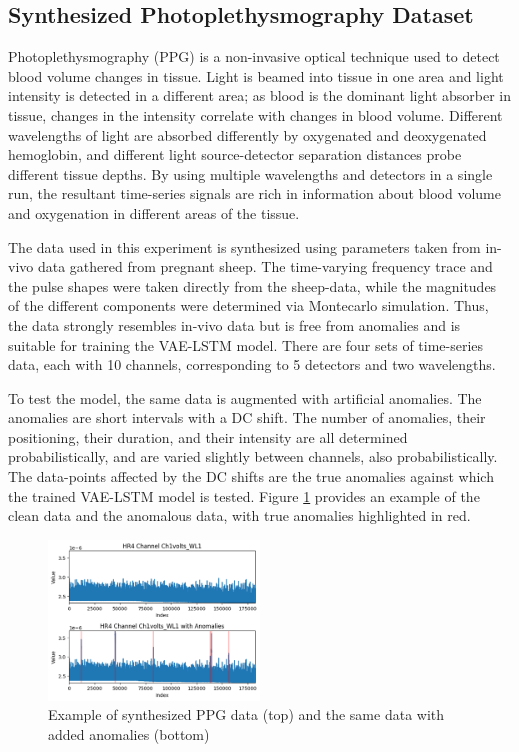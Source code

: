 \documentclass[conference]{IEEEtran}
\begin{document}
\subsection{Synthesized Photoplethysmography Dataset}
Photoplethysmography (PPG) is a non-invasive optical technique used to detect blood volume changes in tissue. Light is beamed into tissue in one area and light intensity is detected in a different area; as blood is the dominant light absorber in tissue, changes in the intensity correlate with changes in blood volume. Different wavelengths of light are absorbed differently by oxygenated and deoxygenated hemoglobin, and different light source-detector separation distances probe different tissue depths. By using multiple wavelengths and detectors in a single run, the resultant time-series signals are rich in information about blood volume and oxygenation in different areas of the tissue.

The data used in this experiment is synthesized using parameters taken from in-vivo data gathered from pregnant sheep. The time-varying frequency trace and the pulse shapes were taken directly from the sheep-data, while the magnitudes of the different components were determined via Montecarlo simulation. Thus, the data strongly resembles in-vivo data but is free from anomalies and is suitable for training the VAE-LSTM model. There are four sets of time-series data, each with 10 channels, corresponding to 5 detectors and two wavelengths.

To test the model, the same data is augmented with artificial anomalies. The anomalies are short intervals with a DC shift. The number of anomalies, their positioning, their duration, and their intensity are all determined probabilistically, and are varied slightly between channels, also probabilistically. The data-points affected by the DC shifts are the true anomalies against which the trained VAE-LSTM model is tested. Figure \ref{ck_fig_1} provides an example of the clean data and the anomalous data, with true anomalies highlighted in red.

\begin{figure}[htbp]
    \centering
    \includegraphics[width=0.5\textwidth]{ck_fig_1.png}
    \caption{Example of synthesized PPG data (top) and the same data with added anomalies (bottom)}
    \label{ck_fig_1}
\end{figure}
\end{document}
